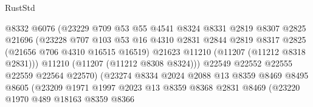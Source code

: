 \begin{lexlean}{RustStd}
\begin{coremodule}
                                  @8332
                                  @6076
                                  (@23229
                                    @709
                                    @53
                                    @55
                                    @4541
                                    @8324
                                    @8331
                                    @2819
                                    @8307
                                    @2825
                                    @21696
                                    (@23228
                                      @707
                                      @103
                                      @53
                                      @16
                                      @4310
                                      @2831
                                      @2844
                                      @2819
                                      @8317
                                      @2825
                                      (@21656 @706 @4310 @16515 @16519)
                                      @21623
                                      @11210
                                      (@11207 (@11212 @8318 @2831)))
                                    @11210
                                    (@11207 (@11212 @8308 @8324)))
                                  @22549
                                  @22552
                                  @22555
                                  @22559
                                  @22564
                                  @22570)
                                (@23274
                                  @8334
                                  @2024
                                  @2088
                                  @13
                                  @8359
                                  @8469
                                  @8495
                                  @8605
                                  (@23209
                                    @1971
                                    @1997
                                    @2023
                                    @13
                                    @8359
                                    @8368
                                    @2831
                                    @8469
                                    (@23220
                                      @1970
                                      @489
                                      @18163
                                      @8359
                                      @8366

\end{coremodule}
\end{lexlean}

